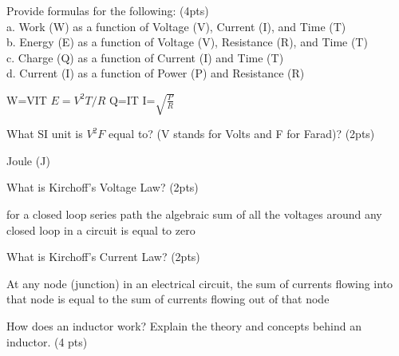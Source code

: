 \documentclass[10pt]{examdesign}
\begin{document}
    \begin{shortanswer}[title={Short Answer, 52 pts total},rearrange=no,resetcounter=no]
        \begin{question}
        Provide formulas for the following: (4pts)
        \\a. Work (W) as a function of Voltage (V), Current (I), and Time (T)
        \\b. Energy (E) as a function of Voltage (V), Resistance (R), and Time (T)
        \\c. Charge (Q) as a function of Current (I) and Time (T)
        \\d. Current (I) as a function of Power (P) and Resistance (R)
        
        \begin{answer}
        W=VIT
        $E=V^2 T/R$
        Q=IT
        I=$\sqrt{\frac{P}{R}}$
        \end{answer}
        \end{question}
        \begin{question}
        What SI unit is $V^2F$ equal to? (V stands for Volts and F for Farad)? (2pts)
        \begin{answer}
        Joule (J)
        \end{answer}
        \end{question}
        \begin{question}
        What is Kirchoff's Voltage Law? (2pts)
        \begin{answer}
        for a closed loop series path the algebraic sum of all the voltages around any closed loop in a circuit is equal to zero
        \end{answer}
        \end{question}
        \begin{question}
        What is Kirchoff's Current Law? (2pts)
        \begin{answer}
        At any node (junction) in an electrical circuit, the sum of currents flowing into that node is equal to the sum of currents flowing out of that node
        \end{answer}
        \end{question}
        \begin{question}
        How does an inductor work? Explain the theory and concepts behind an inductor. (4 pts)
        \begin{answer}
        \end{answer}
        \end{question}

\end{shortanswer}
\end{document}
